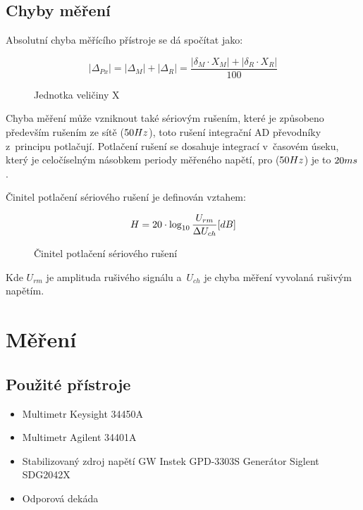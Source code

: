 \documentclass{article}
\begin{document}
\subsection*{Chyby měření}
Absolutní chyba měřícího přístroje se dá spočítat jako:

\begin{figure}[H]
    \begin{equation}
        |\Delta_{Px}| = |\Delta_{M}|+|\Delta_{R}| = \frac{|\delta_M\cdot X_M|+|\delta_R\cdot X_R|}{100}
    \end{equation}
    \caption{\label{proud_kolektoru}Jednotka veličiny X}
\end{figure}
Chyba měření může vzniknout také sériovým rušením, které je způsobeno především rušením ze sítě (\(50\-Hz\)), toto rušení integrační AD převodníky z~principu potlačují.
Potlačení rušení se dosahuje integrací v~časovém úseku, který je celočíselným násobkem periody měřeného napětí, pro (\(50\-Hz\)) je to \(20\-ms\).

Činitel potlačení sériového rušení je definován vztahem:
\begin{figure}[H]
    \begin{equation}
        H = 20 \cdot \log_{10}\frac{U_{rm}}{\Delta U_{ch}}\-[dB]
    \end{equation}
    \caption{\label{cinitel_potlaceni} Činitel potlačení sériového rušení}
\end{figure}
Kde \(U_{rm}\) je amplituda rušivého signálu a~\(U_{ch}\) je chyba měření vyvolaná rušivým napětím.


\section*{Měření}
\subsection*{Použité přístroje}
\begin{itemize}
    \item Multimetr Keysight 34450A
    \item Multimetr Agilent 34401A
    \item Stabilizovaný zdroj napětí GW Instek GPD-3303S Generátor Siglent SDG2042X
    \item Odporová dekáda
\end{itemize}
\end{document}
